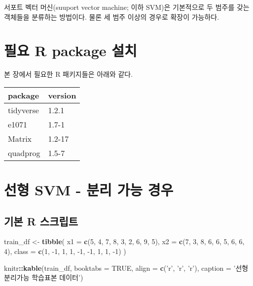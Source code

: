 \documentclass[]{book}
\newenvironment{Shaded}{\begin{snugshade}}{\end{snugshade}}
\newcommand{\DataTypeTok}[1]{\textcolor[rgb]{0.13,0.29,0.53}{#1}}
\newcommand{\DecValTok}[1]{\textcolor[rgb]{0.00,0.00,0.81}{#1}}
\newcommand{\KeywordTok}[1]{\textcolor[rgb]{0.13,0.29,0.53}{\textbf{#1}}}
\newcommand{\NormalTok}[1]{#1}
\newcommand{\OperatorTok}[1]{\textcolor[rgb]{0.81,0.36,0.00}{\textbf{#1}}}
\newcommand{\OtherTok}[1]{\textcolor[rgb]{0.56,0.35,0.01}{#1}}
\newcommand{\StringTok}[1]{\textcolor[rgb]{0.31,0.60,0.02}{#1}}
\begin{document}
서포트 벡터 머신(suuport vector machine; 이하 SVM)은 기본적으로 두 범주를 갖는 객체들을 분류하는 방법이다. 물론 세 범주 이상의 경우로 확장이 가능하다.

\hypertarget{svm-packages-install}{%
\section{필요 R package 설치}\label{svm-packages-install}}

본 장에서 필요한 R 패키지들은 아래와 같다.

\begin{tabular}{l|l}
\hline
package & version\\
\hline
tidyverse & 1.2.1\\
\hline
e1071 & 1.7-1\\
\hline
Matrix & 1.2-17\\
\hline
quadprog & 1.5-7\\
\hline
\end{tabular}

\hypertarget{linear-svm-separable}{%
\section{선형 SVM - 분리 가능 경우}\label{linear-svm-separable}}

\hypertarget{linear-svm-separable-basic-script}{%
\subsection{기본 R 스크립트}\label{linear-svm-separable-basic-script}}

\begin{Shaded}
\begin{Highlighting}[]
\NormalTok{train_df <-}\StringTok{ }\KeywordTok{tibble}\NormalTok{(}
  \DataTypeTok{x1 =} \KeywordTok{c}\NormalTok{(}\DecValTok{5}\NormalTok{, }\DecValTok{4}\NormalTok{, }\DecValTok{7}\NormalTok{, }\DecValTok{8}\NormalTok{, }\DecValTok{3}\NormalTok{, }\DecValTok{2}\NormalTok{, }\DecValTok{6}\NormalTok{, }\DecValTok{9}\NormalTok{, }\DecValTok{5}\NormalTok{),}
  \DataTypeTok{x2 =} \KeywordTok{c}\NormalTok{(}\DecValTok{7}\NormalTok{, }\DecValTok{3}\NormalTok{, }\DecValTok{8}\NormalTok{, }\DecValTok{6}\NormalTok{, }\DecValTok{6}\NormalTok{, }\DecValTok{5}\NormalTok{, }\DecValTok{6}\NormalTok{, }\DecValTok{6}\NormalTok{, }\DecValTok{4}\NormalTok{),}
  \DataTypeTok{class =} \KeywordTok{c}\NormalTok{(}\DecValTok{1}\NormalTok{, }\DecValTok{-1}\NormalTok{, }\DecValTok{1}\NormalTok{, }\DecValTok{1}\NormalTok{, }\DecValTok{-1}\NormalTok{, }\DecValTok{-1}\NormalTok{, }\DecValTok{1}\NormalTok{, }\DecValTok{1}\NormalTok{, }\DecValTok{-1}\NormalTok{)}
\NormalTok{)}

\NormalTok{knitr}\OperatorTok{::}\KeywordTok{kable}\NormalTok{(train_df, }\DataTypeTok{booktabs =} \OtherTok{TRUE}\NormalTok{,}
             \DataTypeTok{align =} \KeywordTok{c}\NormalTok{(}\StringTok{'r'}\NormalTok{, }\StringTok{'r'}\NormalTok{, }\StringTok{'r'}\NormalTok{),}
             \DataTypeTok{caption =} \StringTok{'선형분리가능 학습표본 데이터'}\NormalTok{)}
\end{Highlighting}
\end{Shaded}
\end{document}
